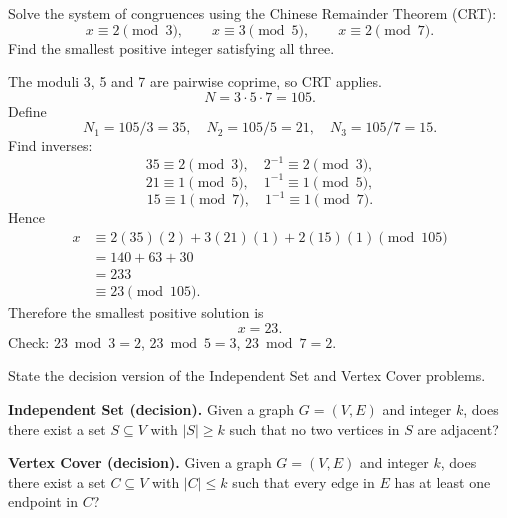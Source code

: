 \documentclass[11pt,a4paper]{article}
\begin{document}
\begin{qaquestion}
Solve the system of congruences using the Chinese Remainder Theorem (CRT):
\[
x\equiv2\pmod3,\qquad
x\equiv3\pmod5,\qquad
x\equiv2\pmod7.
\]
Find the smallest positive integer satisfying all three.
\end{qaquestion}
\begin{qaanswer}[Answer 5(b)]
The moduli 3, 5 and 7 are pairwise coprime, so CRT applies.
\[
N=3\cdot5\cdot7=105.
\]
Define
\[
N_1=105/3=35,\quad N_2=105/5=21,\quad N_3=105/7=15.
\]
Find inverses:
\[
35\equiv2\pmod3,\quad 2^{-1}\equiv2\pmod3,
\]
\[
21\equiv1\pmod5,\quad 1^{-1}\equiv1\pmod5,
\]
\[
15\equiv1\pmod7,\quad 1^{-1}\equiv1\pmod7.
\]
Hence
\[
\begin{aligned}
x&\equiv 2(35)(2)+3(21)(1)+2(15)(1)\pmod{105}\\
&=140+63+30\\
&=233\\
&\equiv23\pmod{105}.
\end{aligned}
\]
Therefore the smallest positive solution is
\[
\boxed{x=23}.
\]
Check: \(23\bmod3=2\), \(23\bmod5=3\), \(23\bmod7=2\).
\end{qaanswer}

\begin{qaquestion}
State the decision version of the Independent Set and Vertex Cover problems.
\end{qaquestion}
\begin{qaanswer}[Answer 6(a)]
\textbf{Independent Set (decision).} Given a graph \(G=(V,E)\) and integer \(k\), does there exist a set \(S\subseteq V\) with \(|S|\ge k\) such that no two vertices in \(S\) are adjacent?

\textbf{Vertex Cover (decision).} Given a graph \(G=(V,E)\) and integer \(k\), does there exist a set \(C\subseteq V\) with \(|C|\le k\) such that every edge in \(E\) has at least one endpoint in \(C\)?
\end{qaanswer}
\end{document}
